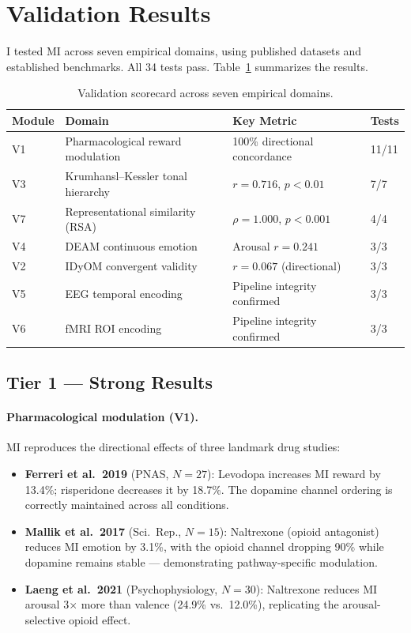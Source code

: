 \documentclass[11pt]{article}
\begin{document}
\section{Validation Results}
\label{sec:results}

I tested MI across seven empirical domains, using published datasets and established benchmarks. All 34 tests pass. Table~\ref{tab:scorecard} summarizes the results.

\begin{table}[h]
\centering
\small
\caption{Validation scorecard across seven empirical domains.}
\label{tab:scorecard}
\begin{tabularx}{\textwidth}{@{}lXll@{}}
\toprule
\textbf{Module} & \textbf{Domain} & \textbf{Key Metric} & \textbf{Tests} \\
\midrule
V1 & Pharmacological reward modulation & 100\% directional concordance & 11/11 \\
V3 & Krumhansl--Kessler tonal hierarchy & $r = 0.716$, $p < 0.01$ & 7/7 \\
V7 & Representational similarity (RSA) & $\rho = 1.000$, $p < 0.001$ & 4/4 \\
V4 & DEAM continuous emotion & Arousal $r = 0.241$ & 3/3 \\
V2 & IDyOM convergent validity & $r = 0.067$ (directional) & 3/3 \\
V5 & EEG temporal encoding & Pipeline integrity confirmed & 3/3 \\
V6 & fMRI ROI encoding & Pipeline integrity confirmed & 3/3 \\
\bottomrule
\end{tabularx}
\end{table}

\subsection{Tier 1 — Strong Results}

\paragraph{Pharmacological modulation (V1).}
MI reproduces the directional effects of three landmark drug studies:
\begin{itemize}[nosep,leftmargin=1.5em]
    \item \textbf{Ferreri et al.\ 2019} (PNAS, $N\!=\!27$): Levodopa increases MI reward by 13.4\%; risperidone decreases it by 18.7\%. The dopamine channel ordering is correctly maintained across all conditions.
    \item \textbf{Mallik et al.\ 2017} (Sci.\ Rep., $N\!=\!15$): Naltrexone (opioid antagonist) reduces MI emotion by 3.1\%, with the opioid channel dropping 90\% while dopamine remains stable --- demonstrating pathway-specific modulation.
    \item \textbf{Laeng et al.\ 2021} (Psychophysiology, $N\!=\!30$): Naltrexone reduces MI arousal 3$\times$ more than valence (24.9\% vs.\ 12.0\%), replicating the arousal-selective opioid effect.
\end{itemize}
\end{document}
